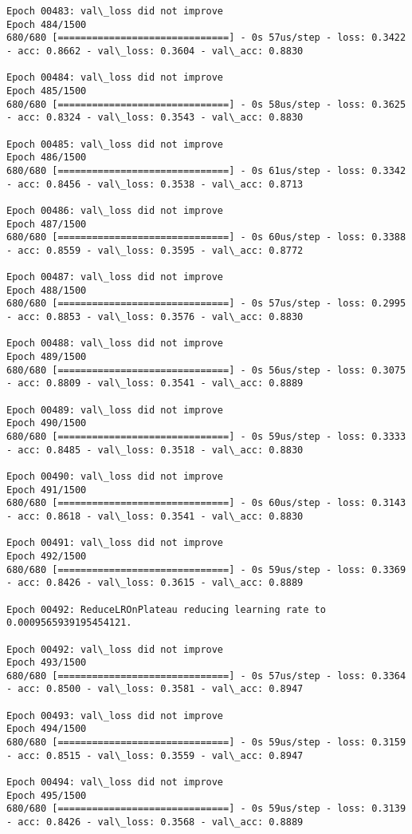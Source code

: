 \documentclass[11pt]{article}
\begin{document}
\begin{Verbatim}[commandchars=\\\{\}]
Epoch 00483: val\_loss did not improve
Epoch 484/1500
680/680 [==============================] - 0s 57us/step - loss: 0.3422 - acc: 0.8662 - val\_loss: 0.3604 - val\_acc: 0.8830

Epoch 00484: val\_loss did not improve
Epoch 485/1500
680/680 [==============================] - 0s 58us/step - loss: 0.3625 - acc: 0.8324 - val\_loss: 0.3543 - val\_acc: 0.8830

Epoch 00485: val\_loss did not improve
Epoch 486/1500
680/680 [==============================] - 0s 61us/step - loss: 0.3342 - acc: 0.8456 - val\_loss: 0.3538 - val\_acc: 0.8713

Epoch 00486: val\_loss did not improve
Epoch 487/1500
680/680 [==============================] - 0s 60us/step - loss: 0.3388 - acc: 0.8559 - val\_loss: 0.3595 - val\_acc: 0.8772

Epoch 00487: val\_loss did not improve
Epoch 488/1500
680/680 [==============================] - 0s 57us/step - loss: 0.2995 - acc: 0.8853 - val\_loss: 0.3576 - val\_acc: 0.8830

Epoch 00488: val\_loss did not improve
Epoch 489/1500
680/680 [==============================] - 0s 56us/step - loss: 0.3075 - acc: 0.8809 - val\_loss: 0.3541 - val\_acc: 0.8889

Epoch 00489: val\_loss did not improve
Epoch 490/1500
680/680 [==============================] - 0s 59us/step - loss: 0.3333 - acc: 0.8485 - val\_loss: 0.3518 - val\_acc: 0.8830

Epoch 00490: val\_loss did not improve
Epoch 491/1500
680/680 [==============================] - 0s 60us/step - loss: 0.3143 - acc: 0.8618 - val\_loss: 0.3541 - val\_acc: 0.8830

Epoch 00491: val\_loss did not improve
Epoch 492/1500
680/680 [==============================] - 0s 59us/step - loss: 0.3369 - acc: 0.8426 - val\_loss: 0.3615 - val\_acc: 0.8889

Epoch 00492: ReduceLROnPlateau reducing learning rate to 0.0009565939195454121.

Epoch 00492: val\_loss did not improve
Epoch 493/1500
680/680 [==============================] - 0s 57us/step - loss: 0.3364 - acc: 0.8500 - val\_loss: 0.3581 - val\_acc: 0.8947

Epoch 00493: val\_loss did not improve
Epoch 494/1500
680/680 [==============================] - 0s 59us/step - loss: 0.3159 - acc: 0.8515 - val\_loss: 0.3559 - val\_acc: 0.8947

Epoch 00494: val\_loss did not improve
Epoch 495/1500
680/680 [==============================] - 0s 59us/step - loss: 0.3139 - acc: 0.8426 - val\_loss: 0.3568 - val\_acc: 0.8889


\end{Verbatim}
\end{document}
